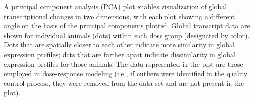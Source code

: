 A principal component analysis (PCA) plot enables visualization of global transcriptional changes in two dimensions, with each plot showing a different angle on the basis of the principal components plotted. Global transcript data are shown for individual animals (dots) within each dose group (designated by color). Dots that are spatially closer to each other indicate more similarity in global expression profiles; dots that are farther apart indicate dissimilarity in global expression profiles for those animals. The data represented in the plot are those employed in dose-response modeling (i.e., if outliers were identified in the quality control process, they were removed from the data set and are not present in the plot).
